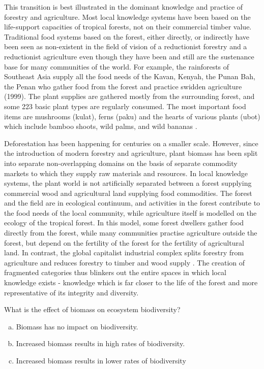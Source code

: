 This transition is best illustrated in the dominant knowledge and practice of forestry and agriculture. Most local knowledge systems have been based on the life-support capacities of tropical forests, not on their commercial timber value. Traditional food systems based on the forest, either directly, or indirectly have been seen as non-existent in the field of vision of a reductionist forestry and a reductionist agriculture even though they have been and still are the sustenance base for many communities of the world. For example, the rainforests of Southeast Asia supply all the food needs of the Kavan, Kenyah, the Punan Bah, the Penan who gather food from the forest and practice swidden agriculture (1999). The plant supplies are gathered mostly from the surrounding forest, and some 223 basic plant types are regularly consumed. The most important food items are mushrooms (kulat), ferns (paku) and the hearts of various plants (ubot) which include bamboo shoots, wild palms, and wild bananas \citep{hong1987natives}.

Deforestation has been happening for centuries on a smaller scale. However, since the introduction of modern forestry and agriculture, plant biomass has been split into separate non-overlapping domains on the basis of separate commodity markets to which they supply raw materials and resources. In local knowledge systems, the plant world is not artificially separated between a forest supplying commercial wood and agricultural land supplying food commodities. The forest and the field are in ecological continuum, and activities in the forest contribute to the food needs of the local community, while agriculture itself is modelled on the ecology of the tropical forest. In this model, some forest dwellers gather food directly from the forest, while many communities practise agriculture outside the forest, but depend on the fertility of the forest for the fertility of agricultural land. In contrast, the global capitalist industrial complex splits forestry from agriculture and reduces forestry to timber and wood supply \citep{de1989economic}. The creation of fragmented categories thus blinkers out the entire spaces in which local knowledge exists - knowledge which is far closer to the life of the forest and more representative of its integrity and diversity.





\begin{problem}
What is the effect of biomass on ecosystem biodiversity?
\begin{enumerate}[(a)]
\item Biomass has no impact on biodiversity.
\item Increased biomass results in high rates of biodiversity.
\item Increased biomass results in lower rates of biodiversity 
\end{enumerate}
\end{problem}

